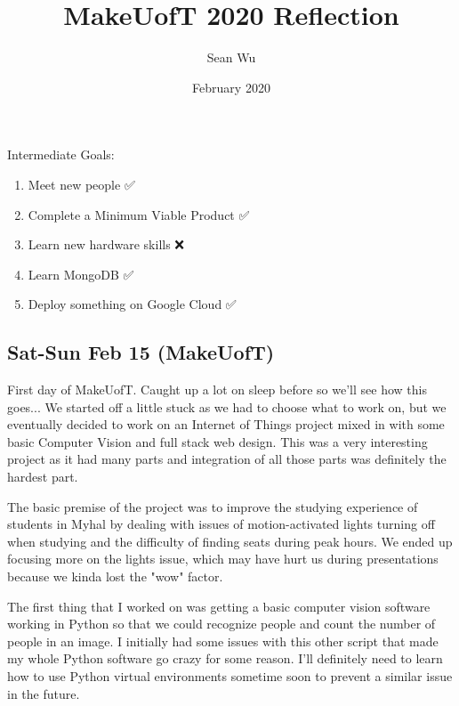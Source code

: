 \documentclass[a4paper,12pt]{gress}
\title{MakeUofT 2020 Reflection}
\author{Sean Wu}
\date{February 2020}
\begin{document}
\begin{titlepage}

\maketitle

\begin{goals}
Intermediate Goals:
\begin{enumerate}
  \item Meet new people ✅
  \item Complete a Minimum Viable Product ✅
  \item Learn new hardware skills ❌
  \item Learn MongoDB ✅
  \item Deploy something on Google Cloud ✅
\end{enumerate}
\end{goals}

\newpage

\tableofcontents

\end{titlepage}


\subsection{Sat-Sun Feb 15 (MakeUofT)}
First day of MakeUofT. Caught up a lot on sleep before so we'll see how this goes... We started off a little stuck as we had to choose what to work on, but we eventually decided to work on an Internet of Things project mixed in with some basic Computer Vision and full stack web design. This was a very interesting project as it had many parts and integration of all those parts was definitely the hardest part.

The basic premise of the project was to improve the studying experience of students in Myhal by dealing with issues of motion-activated lights turning off when studying and the difficulty of finding seats during peak hours. We ended up focusing more on the lights issue, which may have hurt us during presentations because we kinda lost the "wow" factor.

The first thing that I worked on was getting a basic computer vision software working in Python so that we could recognize people and count the number of people in an image. I initially had some issues with this other script that made my whole Python software go crazy for some reason. I'll definitely need to learn how to use Python virtual environments sometime soon to prevent a similar issue in the future.
\end{document}
